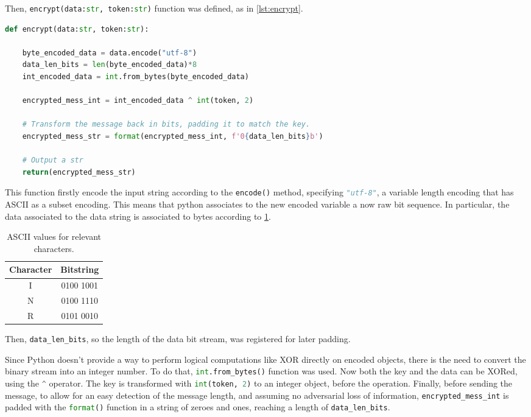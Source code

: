 Then, \lstinline[language=Python]|encrypt(data:str, token:str)|
function was defined,
as in \cref{lst:encrypt}.

\begin{lstlisting}[basicstyle=\ttfamily\footnotesize, language=python, caption=Encryption function. , label=lst:encrypt, float=h]
def encrypt(data:str, token:str):

    byte_encoded_data = data.encode("utf-8")
    data_len_bits = len(byte_encoded_data)*8
    int_encoded_data = int.from_bytes(byte_encoded_data)

    encrypted_mess_int = int_encoded_data ^ int(token, 2)

    # Transform the message back in bits, padding it to match the key.
    encrypted_mess_str = format(encrypted_mess_int, f'0{data_len_bits}b')

    # Output a str
    return(encrypted_mess_str)
\end{lstlisting}

This function firstly encode the input string according to
the
\lstinline[language=Python]|encode()|
method,
specifying \lstinline[language=Python]|"utf-8"|,
a variable length encoding that has ASCII as a subset encoding. This means
that python associates to the new encoded variable a now raw bit sequence. In
particular, the data associated to the data string is associated to
bytes according to \cref{tab:ascii}.
\begin{table}[h]
  \centering
  \begin{tabular}{cc}
    \toprule
    Character & Bitstring \\
    \midrule
    I & 0100 1001 \\
    N & 0100 1110 \\
    R & 0101 0010 \\
    \bottomrule
  \end{tabular}
  \caption{ASCII values for relevant characters.}
  \label{tab:ascii}
\end{table}

Then, \lstinline[language=Python]|data_len_bits|, so the
length of the data bit stream, was registered for later padding.

Since Python doesn't provide a way to perform logical computations like XOR
directly on encoded objects, there is the need to convert the
binary stream into an integer number.
To do that,
\lstinline[language=Python]|int.from_bytes()| function
was used. Now both the key and the data can be XORed, using
the \lstinline[language=Python]|^| operator. The key is transformed with
\lstinline[language=Python]|int(token, 2)| to an integer object,
before the operation.
Finally, before sending the message, to allow for an easy detection
of the message length,
and assuming no adversarial loss of information,
\lstinline[language=Python]|encrypted_mess_int|
is padded with the \lstinline[language=Python]|format()| function in a string
of zeroes and ones, reaching a length of
\lstinline[language=Python]|data_len_bits|.

